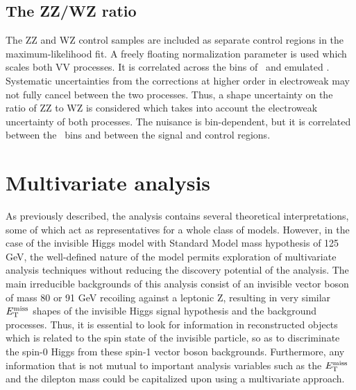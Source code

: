 \subsection{The ZZ/WZ ratio}

The ZZ and WZ control samples are included as separate control regions in the maximum-likelihood fit.
A freely floating normalization parameter is used which scales both VV processes. It is correlated across the bins of \met~and emulated \met.
Systematic uncertainties from the corrections at higher order in electroweak may not fully cancel between the two processes.
Thus, a shape uncertainty on the ratio of ZZ to WZ is considered which takes into account the electroweak uncertainty of both processes.
The nuisance is bin-dependent, but it is correlated between the \met~bins and between the signal and control regions.

\section{Multivariate analysis}
\label{sec:dmmva}
As previously described, the analysis contains several theoretical interpretations, some of which act as representatives for a whole class of models.
However, in the case of the invisible Higgs model with Standard Model mass hypothesis of 125 GeV,
the well-defined nature of the model permits exploration of multivariate analysis techniques without reducing the discovery potential of the analysis.
The main irreducible backgrounds of this analysis consist of an invisible vector boson of mass 80 or 91 GeV recoiling against a leptonic Z, resulting in very similar 
$E_\mathrm{T}^{\mathrm{miss}}$ shapes of the invisible Higgs signal hypothesis and the background processes.
Thus, it is essential to look for information in reconstructed objects
which is related to the spin state of the invisible particle, so as to discriminate the spin-0 Higgs from these spin-1 vector boson backgrounds.
Furthermore, any information that is not mutual to important analysis variables such as the $E_\mathrm{T}^{\mathrm{miss}}$ and the dilepton mass could be capitalized upon using a multivariate approach.

